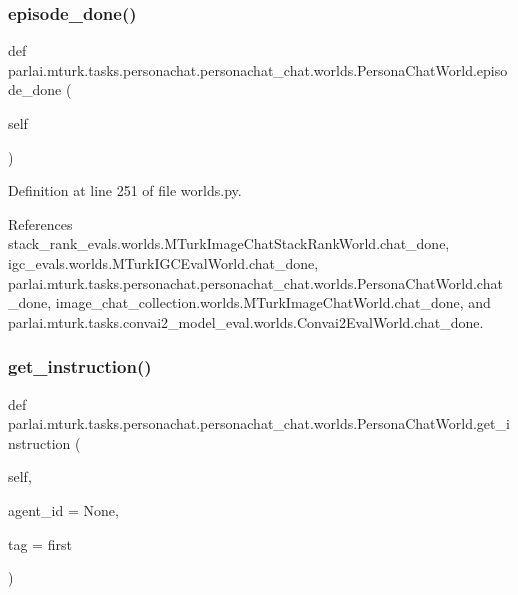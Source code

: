 \subsubsection{\texorpdfstring{episode\+\_\+done()}{episode\_done()}}
{\footnotesize\ttfamily def parlai.\+mturk.\+tasks.\+personachat.\+personachat\+\_\+chat.\+worlds.\+Persona\+Chat\+World.\+episode\+\_\+done (\begin{DoxyParamCaption}\item[{}]{self }\end{DoxyParamCaption})}



Definition at line 251 of file worlds.\+py.



References stack\+\_\+rank\+\_\+evals.\+worlds.\+M\+Turk\+Image\+Chat\+Stack\+Rank\+World.\+chat\+\_\+done, igc\+\_\+evals.\+worlds.\+M\+Turk\+I\+G\+C\+Eval\+World.\+chat\+\_\+done, parlai.\+mturk.\+tasks.\+personachat.\+personachat\+\_\+chat.\+worlds.\+Persona\+Chat\+World.\+chat\+\_\+done, image\+\_\+chat\+\_\+collection.\+worlds.\+M\+Turk\+Image\+Chat\+World.\+chat\+\_\+done, and parlai.\+mturk.\+tasks.\+convai2\+\_\+model\+\_\+eval.\+worlds.\+Convai2\+Eval\+World.\+chat\+\_\+done.

\mbox{\label{classparlai_1_1mturk_1_1tasks_1_1personachat_1_1personachat__chat_1_1worlds_1_1PersonaChatWorld_accac4ee2dc51850f0af8fa43055023e7}} 
\subsubsection{\texorpdfstring{get\+\_\+instruction()}{get\_instruction()}}
{\footnotesize\ttfamily def parlai.\+mturk.\+tasks.\+personachat.\+personachat\+\_\+chat.\+worlds.\+Persona\+Chat\+World.\+get\+\_\+instruction (\begin{DoxyParamCaption}\item[{}]{self,  }\item[{}]{agent\+\_\+id = {\ttfamily None},  }\item[{}]{tag = {\ttfamily \textquotesingle{}first\textquotesingle{}} }\end{DoxyParamCaption})}



